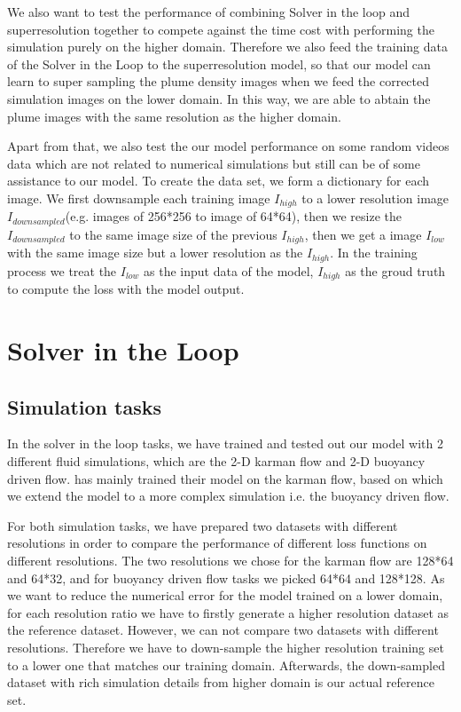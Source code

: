 \documentclass[a4paper,12pt,twoside]{report}
\begin{document}
We also want to test the performance of combining Solver in the loop and superresolution together to compete against the time cost with performing the simulation purely on the higher domain. Therefore we also feed the training data of the Solver in the Loop to the superresolution model, so that our model can learn to super sampling the plume density images when we feed the corrected simulation images on the lower domain. In this way, we are able to abtain the plume images with the same resolution as the higher domain.

Apart from that, we also test the our model performance on some random videos data which are not related to numerical simulations but still can be of some assistance to our model.
To create the data set, we form a dictionary for each image. We first downsample each training image $I_{high}$ to a lower resolution image $I_{downsampled}$(e.g. images of 256*256 to image of 64*64), then we resize the $I_{downsampled}$ to the same image size of the previous $I_{high}$, then we get a image $I_{low}$ with the same image size but a lower resolution as the $I_{high}$. In the training process we treat the $I_{low}$ as the input data of the model, $I_{high}$ as the groud truth to compute the loss with the model output.
\section{Solver in the Loop}
\subsection{Simulation tasks}
In the solver in the loop tasks, we have trained and tested out our model with 2 different fluid simulations, which are the 2-D karman flow and 2-D buoyancy driven flow. \citeauthor{um2020sol} has mainly trained their model on the karman flow, based on which we extend the model to a more complex simulation i.e. the buoyancy driven flow. 

For both simulation tasks, we have prepared two datasets with different resolutions in order to compare the performance of different loss functions on different resolutions. The two resolutions we chose for the karman flow are 128*64 and 64*32, and for buoyancy driven flow tasks we picked 64*64 and 128*128. As we want to reduce the numerical error for the model trained on a lower domain, for each resolution ratio we have to firstly generate a higher resolution dataset as the reference dataset. However, we can not compare two datasets with different resolutions. Therefore we have to down-sample the higher resolution training set to a lower one that matches our training domain. Afterwards, the down-sampled dataset with rich simulation details from higher domain is our actual reference set.
\end{document}

